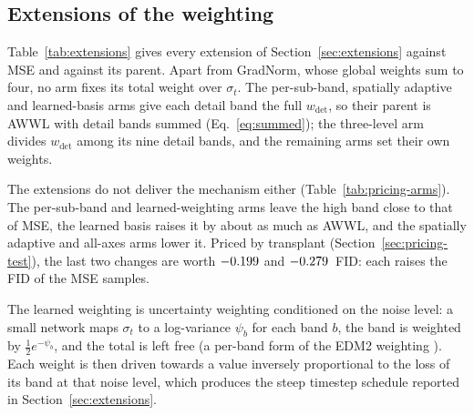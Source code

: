 

\FloatBarrier
\subsection{Extensions of the weighting}
\label{app:supp-extensions}

Table~\ref{tab:extensions} gives every extension of
Section~\ref{sec:extensions} against MSE and against its parent. Apart from
GradNorm, whose global weights sum to four, no arm fixes its total weight
over $\sigma_t$. The per-sub-band, spatially adaptive and learned-basis arms
give each detail band the full $w_{\det}$, so their parent is AWWL with detail
bands summed (Eq.~\eqref{eq:summed}); the three-level arm divides $w_{\det}$
among its nine detail bands, and the remaining arms set their own weights.

The extensions do not deliver the mechanism either
(Table~\ref{tab:pricing-arms}). The per-sub-band and learned-weighting arms
leave the high band close to that of MSE, the learned basis raises it by about
as much as AWWL, and the spatially adaptive and all-axes arms lower it.
Priced by transplant (Section~\ref{sec:pricing-test}), the last two changes
are worth $-0.199$ and $-0.279$~FID: each raises the FID
of the MSE samples.

The learned weighting is uncertainty weighting \citep{kendall2018multi}
conditioned on the noise level: a small network maps $\sigma_t$ to a
log-variance $\psi_b$ for each band $b$, the band is weighted by
$\tfrac{1}{2}e^{-\psi_b}$, and the total is left free (a per-band form of the
EDM2 weighting \citep{karras2024analyzing}). Each weight is then driven
towards a value inversely proportional to the loss of its band at that noise
level, which produces the steep timestep schedule reported in
Section~\ref{sec:extensions}.

